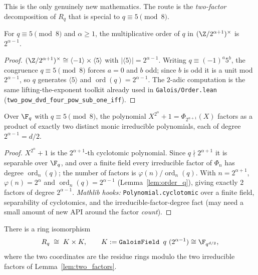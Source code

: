 This is the only genuinely new mathematics. The route is the \emph{two-factor} decomposition of
$R_q$ that is special to $q \equiv 5 \pmod 8$.

\begin{lemma}\label{lem:order_q}
For $q \equiv 5 \pmod 8$ and $\alpha \ge 1$, the multiplicative order of $q$ in
$(\Z/2^{\alpha+1})^\times$ is $2^{\alpha-1}$.
\end{lemma}

\begin{proof}
$(\Z/2^{\alpha+1})^\times \cong \langle -1\rangle \times \langle 5\rangle$ with
$|\langle 5\rangle| = 2^{\alpha-1}$. Writing $q \equiv (-1)^a 5^b$, the congruence $q \equiv 5
\pmod 8$ forces $a = 0$ and $b$ odd; since $b$ is odd it is a unit mod $2^{\alpha-1}$, so
$q$ generates $\langle 5\rangle$ and $\operatorname{ord}(q) = 2^{\alpha-1}$. The $2$-adic
computation is the same lifting-the-exponent toolkit already used in
\texttt{Galois/Order.lean} (\texttt{two\_pow\_dvd\_four\_pow\_sub\_one\_iff}).
\end{proof}

\begin{lemma}\label{lem:two_factors}
Over $\F_q$ with $q \equiv 5 \pmod 8$, the polynomial $X^{2^\alpha}+1 = \Phi_{2^{\alpha+1}}(X)$
factors as a product of exactly two distinct monic irreducible polynomials, each of degree
$2^{\alpha-1} = d/2$.
\end{lemma}

\begin{proof}
$X^{2^\alpha}+1$ is the $2^{\alpha+1}$-th cyclotomic polynomial. Since $q \nmid 2^{\alpha+1}$ it is
separable over $\F_q$, and over a finite field every irreducible factor of $\Phi_n$ has degree
$\operatorname{ord}_n(q)$; the number of factors is $\varphi(n)/\operatorname{ord}_n(q)$. With
$n = 2^{\alpha+1}$, $\varphi(n) = 2^\alpha$ and $\operatorname{ord}_n(q) = 2^{\alpha-1}$
(Lemma~\ref{lem:order_q}), giving exactly $2$ factors of degree $2^{\alpha-1}$.
\emph{Mathlib hooks:} \texttt{Polynomial.cyclotomic} over a finite field, separability of
cyclotomics, and the irreducible-factor-degree fact (may need a small amount of new API around
the factor \emph{count}).
\end{proof}

\begin{theorem}\label{thm:crt_two_factor}
There is a ring isomorphism
\[
  R_q \;\cong\; K \times K, \qquad K := \texttt{GaloisField } q\ (2^{\alpha-1}) \cong \F_{q^{d/2}},
\]
where the two coordinates are the residue rings modulo the two irreducible factors of
Lemma~\ref{lem:two_factors}.
\end{theorem}

